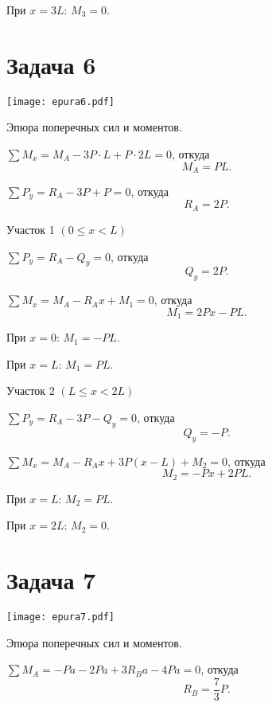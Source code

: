 При $x = 3L$: $M_3 = 0$.

\newpage


\section{Задача 6}

\begin{floatingfigure}[r]{0.5\textwidth}
    \centering
    \texttt{[image: epura6.pdf]}
    \caption{Эпюра поперечных сил и моментов.}
    \label{fig:chap1-epura6}
\end{floatingfigure}

$\sum M_x = M_A - 3P \cdot L + P \cdot 2L = 0$,
откуда
\[
    M_A = PL.
\]

$\sum P_y = R_A - 3P + P = 0$,
откуда
\[
    R_A = 2P.
\]

\vspace{1.5ex}

Участок 1 $\left(0 \le x < L\right)$

$\sum P_y = R_A - Q_y = 0$,
откуда
\[
    Q_y = 2P.
\]

$\sum M_x = M_A - R_A x + M_1 = 0$,
откуда
\[
    M_1 = 2Px - PL.
\]

При $x = 0$: $M_1 = -PL$.

При $x = L$: $M_1 = PL$.

\vspace{1.5ex}

Участок 2 $ \left(L \le x < 2L\right)$

$\sum P_y = R_A - 3P - Q_y = 0$,
откуда
\[
    Q_y = -P.
\]

$ \sum M_x = M_A - R_A x + 3P (x-L) + M_2 = 0 $,
откуда
\[
    M_2 = -Px + 2PL.
\]

При $x = L$: $M_2 = PL$.

При $x = 2L$: $M_2 = 0$.

\newpage


\section{Задача 7}

\begin{floatingfigure}[r]{0.5\textwidth}
    \centering
    \texttt{[image: epura7.pdf]}
    \caption{Эпюра поперечных сил и моментов.}
    \label{fig:chap1-epura7}
\end{floatingfigure}

$\sum M_A = -Pa - 2 P a + 3 R_B a - 4 P a = 0$,
откуда
\[
    R_B = \frac{7}{3}P.
\]

